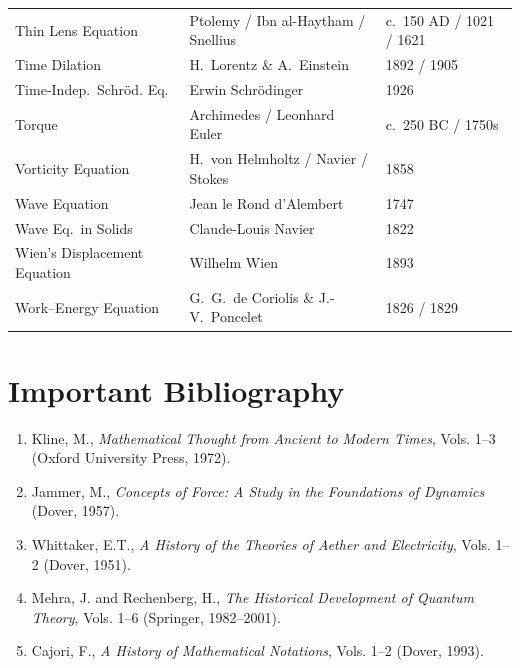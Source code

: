 \begin{longtable}{p{6cm}p{6cm}p{2.5cm}}
Thin Lens Equation & Ptolemy / Ibn al-Haytham / Snellius & c.\ 150 AD / 1021 / 1621 \\
Time Dilation & H.\ Lorentz \& A.\ Einstein & 1892 / 1905 \\
Time-Indep.\ Schr\"od. Eq. & Erwin Schr\"odinger & 1926 \\
Torque & Archimedes / Leonhard Euler & c.\ 250 BC / 1750s \\
Vorticity Equation & H.\ von Helmholtz / Navier / Stokes & 1858 \\
Wave Equation & Jean le Rond d'Alembert & 1747 \\
Wave Eq.\ in Solids & Claude-Louis Navier & 1822 \\
Wien's Displacement Equation & Wilhelm Wien & 1893 \\
Work--Energy Equation & G.\ G.\ de Coriolis \& J.-V.\ Poncelet & 1826 / 1829 \\
\end{longtable}

\section*{Important Bibliography}

\begin{enumerate}
\item Kline, M., \textit{Mathematical Thought from Ancient to Modern Times}, Vols. 1--3 (Oxford University Press, 1972).
\item Jammer, M., \textit{Concepts of Force: A Study in the Foundations of Dynamics} (Dover, 1957).
\item Whittaker, E.T., \textit{A History of the Theories of Aether and Electricity}, Vols. 1--2 (Dover, 1951).
\item Mehra, J. and Rechenberg, H., \textit{The Historical Development of Quantum Theory}, Vols. 1--6 (Springer, 1982--2001).
\item Cajori, F., \textit{A History of Mathematical Notations}, Vols. 1--2 (Dover, 1993).
\end{enumerate}



